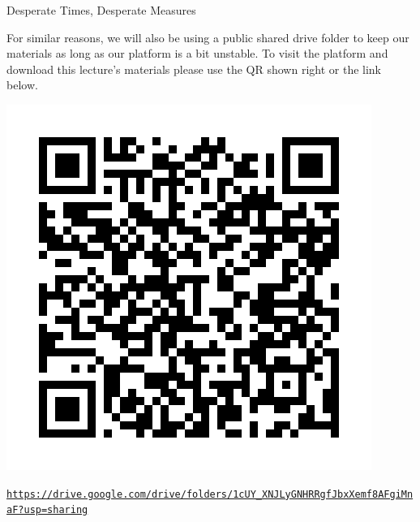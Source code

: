 \documentclass[aspectratio=169, 12pt, xcolor=table]{beamer}
\newcommand{\ohref}[1]{\href{#1}{\texttt{#1}}}
\begin{document}
	\begin{headsup}{Desperate Times, Desperate Measures}
		\begin{minipage}[t]{0.50\textwidth}
			\vspace{0pt}
			For similar reasons, we will also be using a public shared drive folder to keep our materials as long as our platform is a bit unstable. To visit the platform and download this lecture's materials please use the QR shown right or the link below.
		\end{minipage}\hfill
		\begin{minipage}[t]{0.48\textwidth}
			\vspace{0pt}
			\raggedleft
			\includegraphics[scale=0.25]{./assets/shared_folder.png}
			\centering
		\end{minipage}
		\vfill
		\begin{scriptsize}
			\ohref{https://drive.google.com/drive/folders/1cUY\_XNJLyGNHRRgfJbxXemf8AFgiMnaF?usp=sharing}
		\end{scriptsize}
	\end{headsup}
\end{document}
